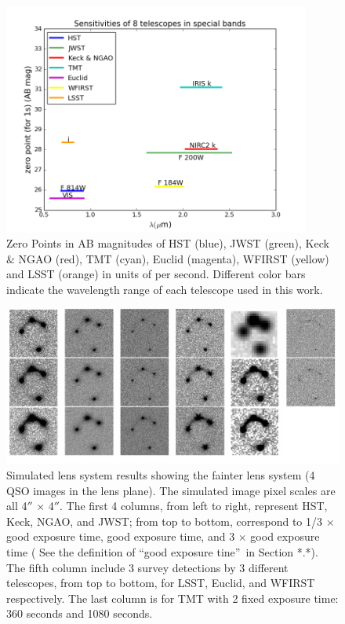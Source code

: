 \documentclass[a4paper,11pt]{article}
\begin{document}
\begin{figure}
\begin{center}
\includegraphics[width=0.9\textwidth]{wavelength_zp.png}
\end{center}
\caption{Zero Points in AB magnitudes of HST (blue), JWST (green), Keck $\&$ NGAO (red), TMT (cyan), Euclid (magenta), WFIRST (yellow) and LSST (orange) in units of per second. Different color bars indicate the wavelength range of each telescope used in this work.}
\label{fig:zp_wavelength}
\end{figure}


\begin{figure}
\begin{center}
\includegraphics[width=1.0\textwidth]{fainter_system_4QSOimages_all.png}
\end{center}
\caption{Simulated lens system results showing the fainter lens system (4 QSO images in the lens plane). The simulated image pixel scales are all 4$''$ $\times$ 4$''$. The first 4 columns, from left to right, represent HST, Keck, NGAO, and JWST; from top to bottom, correspond to 1/3 $\times$ good exposure time, good exposure time, and 3 $\times$ good exposure time ( See the definition of \textquotedblleft good exposure tine\textquotedblright\ in Section *.*). The fifth column include 3 survey detections by 3 different telescopes, from top to bottom, for LSST, Euclid, and WFIRST respectively. The last column is for TMT with 2 fixed exposure time: 360 seconds and 1080 seconds.}
\label{fig:fainter_4QSOimages_montage}
\end{figure}
\end{document}
